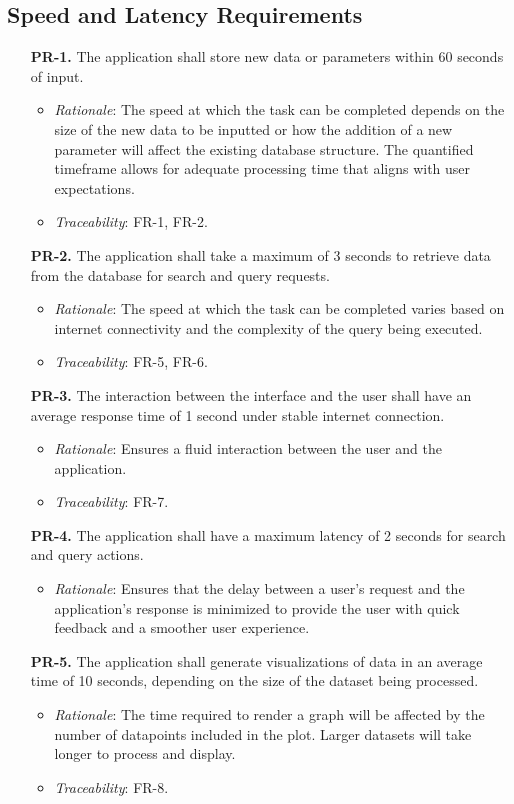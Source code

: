 \documentclass[12pt]{article}
\begin{document}
\subsection{Speed and Latency Requirements}
\begin{enumerate}
\item[\textbf{PR-1.}] The application shall store new data or parameters within 60 seconds of input.
  \begin{itemize}
    \item \textit{Rationale}: The speed at which the task can be completed depends on the size of the new data to be inputted or how the addition of a new parameter will affect the existing database structure. The quantified timeframe allows for adequate processing time that aligns with user expectations.
    \item \textit{Traceability}: FR-1, FR-2.
  \end{itemize}
\item[\textbf{PR-2.}] The application shall take a maximum of 3 seconds to retrieve data from the database for search and query requests.
  \begin{itemize}
    \item \textit{Rationale}: The speed at which the task can be completed varies based on internet connectivity and the complexity of the query being executed.
    \item \textit{Traceability}: FR-5, FR-6.
  \end{itemize}
\item[\textbf{PR-3.}] The interaction between the interface and the user shall have an average response time of 1 second under stable internet connection.
  \begin{itemize}
    \item \textit{Rationale}: Ensures a fluid interaction between the user and the application.
    \item \textit{Traceability}: FR-7.
  \end{itemize}
\item[\textbf{PR-4.}] The application shall have a maximum latency of 2 seconds for search and query actions.
  \begin{itemize}
    \item \textit{Rationale}: Ensures that the delay between a user's request and the application's response is minimized to provide the user with quick feedback and a smoother user experience.
  \end{itemize}
\item[\textbf{PR-5.}] The application shall generate visualizations of data in an average time of 10 seconds, depending on the size of the dataset being processed.
  \begin{itemize}
    \item \textit{Rationale}: The time required to render a graph will be affected by the number of datapoints included in the plot. Larger datasets will take longer to process and display.
    \item \textit{Traceability}: FR-8.
  \end{itemize}
\end{enumerate}
\end{document}
